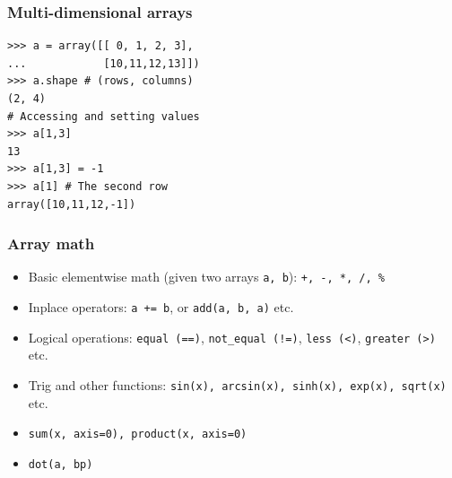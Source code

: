\documentclass[14pt,compress]{beamer}
\newcounter{time}
\newcommand{\inctime}[1]{\addtocounter{time}{#1}{\tiny \thetime\ m}}
\newcommand{\typ}[1]{\texttt{#1}}
\begin{document}

\begin{frame}[fragile]
  \frametitle{Multi-dimensional arrays}
\begin{lstlisting}
>>> a = array([[ 0, 1, 2, 3],
...            [10,11,12,13]])
>>> a.shape # (rows, columns)
(2, 4)
# Accessing and setting values
>>> a[1,3] 
13
>>> a[1,3] = -1
>>> a[1] # The second row
array([10,11,12,-1])

\end{lstlisting}
\end{frame}
\begin{frame}[fragile]
  \frametitle{Array math}
  \begin{itemize}
  \item Basic \alert{elementwise} math (given two arrays \typ{a, b}):
      \typ{+, -, *, /, \%}
  \item Inplace operators: \typ{a += b}, or \typ{add(a, b,
      a)} etc.
  \item Logical operations: \typ{equal (==)}, \typ{not\_equal (!=)},
    \typ{less (<)}, \typ{greater (>)} etc.
  \item Trig and other functions: \typ{sin(x), arcsin(x), sinh(x),
      exp(x), sqrt(x)} etc.
  \item \typ{sum(x, axis=0), product(x, axis=0)} 
  \item \typ{dot(a, bp)}
  \end{itemize}
  \inctime{10}
\end{frame}
\end{document}
